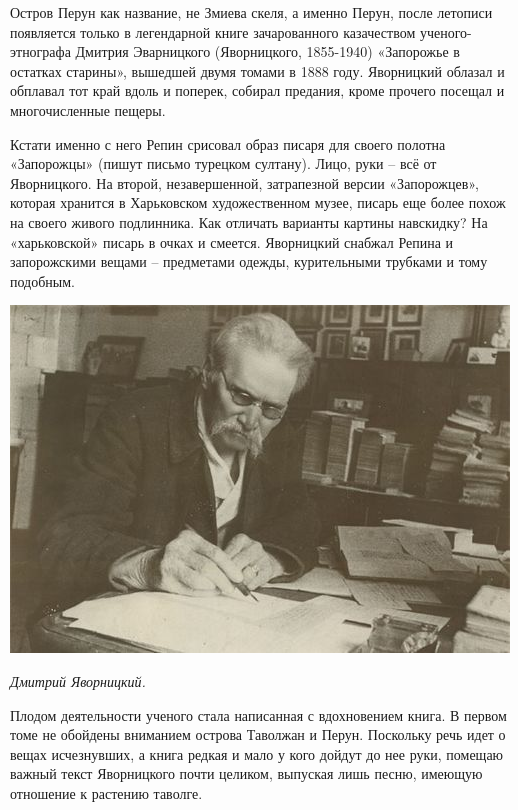 Остров Перун как название, не Змиева скеля, а именно Перун, после летописи появляется только в легендарной книге зачарованного казачеством ученого-этнографа Дмитрия Эварницкого (Яворницкого, 1855-1940) «Запорожье в остатках старины», вышедшей двумя томами в 1888 году. Яворницкий облазал и обплавал тот край вдоль и поперек, собирал предания, кроме прочего посещал и многочисленные пещеры.

Кстати именно с него Репин срисовал образ писаря для своего полотна «Запорожцы» (пишут письмо турецком султану). Лицо, руки – всё от Яворницкого. На второй, незавершенной, затрапезной версии «Запорожцев», которая хранится в Харьковском художественном музее, писарь еще более похож на своего живого подлинника. Как отличать варианты картины навскидку? На «харьковской» писарь в очках и смеется. Яворницкий снабжал Репина и запорожскими вещами – предметами одежды, курительными трубками и тому подобным.

\begin{center}
\includegraphics[width=\linewidth]{chast-zmiy/ktotakiezmei/yavornyckiy01.jpg}

\textit{Дмитрий Яворницкий.}
\end{center}

Плодом деятельности ученого стала написанная с вдохновением книга. В первом томе не обойдены вниманием острова Таволжан и Перун. Поскольку речь идет о вещах исчезнувших, а книга редкая и мало у кого дойдут до нее руки, помещаю важный текст Яворницкого почти целиком, выпуская лишь песню, имеющую отношение к растению таволге.


